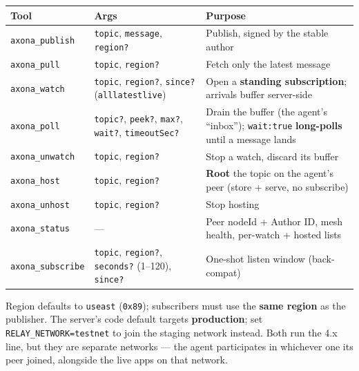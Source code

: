 \documentclass[
  nobib]{tufte-handout}
\newcounter{none} %
\begin{document}
{\def\LTcaptype{none} %
\begin{longtable}[]{@{}
  >{\raggedright\arraybackslash}p{}
  >{\raggedright\arraybackslash}p{}
  >{\raggedright\arraybackslash}p{}@{}}
\toprule\noalign{}
\begin{minipage}[b]{\linewidth}\raggedright
Tool
\end{minipage} & \begin{minipage}[b]{\linewidth}\raggedright
Args
\end{minipage} & \begin{minipage}[b]{\linewidth}\raggedright
Purpose
\end{minipage} \\
\midrule\noalign{}
\endhead
\bottomrule\noalign{}
\endlastfoot
\texttt{axona\_publish} & \texttt{topic}, \texttt{message},
\texttt{region?} & Publish, signed by the stable author \\
\texttt{axona\_pull} & \texttt{topic}, \texttt{region?} & Fetch only the
latest message \\
\texttt{axona\_watch} & \texttt{topic}, \texttt{region?},
\texttt{since?}
(\texttt{all}\textbar{}\texttt{latest}\textbar{}\texttt{live}) & Open a
\textbf{standing subscription}; arrivals buffer server-side \\
\texttt{axona\_poll} & \texttt{topic?}, \texttt{peek?}, \texttt{max?},
\texttt{wait?}, \texttt{timeoutSec?} & Drain the buffer (the agent's
``inbox''); \texttt{wait:true} \textbf{long-polls} until a message
lands \\
\texttt{axona\_unwatch} & \texttt{topic}, \texttt{region?} & Stop a
watch, discard its buffer \\
\texttt{axona\_host} & \texttt{topic}, \texttt{region?} & \textbf{Root}
the topic on the agent's peer (store + serve, no subscribe) \\
\texttt{axona\_unhost} & \texttt{topic}, \texttt{region?} & Stop
hosting \\
\texttt{axona\_status} & --- & Peer nodeId + Author ID, mesh health,
per-watch + hosted lists \\
\texttt{axona\_subscribe} & \texttt{topic}, \texttt{region?},
\texttt{seconds?} (1--120), \texttt{since?} & One-shot listen window
(back-compat) \\
\end{longtable}
}

Region defaults to \texttt{useast} (\texttt{0x89}); subscribers must use
the \textbf{same region} as the publisher. The server's code default
targets \textbf{production}; set \texttt{RELAY\_NETWORK=testnet} to join
the staging network instead. Both run the 4.x line, but they are
separate networks --- the agent participates in whichever one its peer
joined, alongside the live apps on that network.
\end{document}

